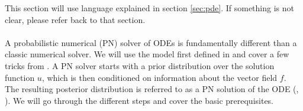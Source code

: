 \ifdefined\COMPILINGFROMMAIN
\else
    
    
\fi

This section will use language explained in section \ref{sec:pde}. If something is not clear, please refer back to that section.
\\
\\
A probabilistic numerical (PN) solver of ODEs is fundamentally different than a classic numerical solver. We will use the model first defined in \cite{invention_of_ODE_solver} and cover a few tricks from \cite{nicoThesis}. A PN solver starts with a prior distribution over the solution function $u$, which is then conditioned on information about the vector field $f$. The resulting posterior distribution is referred to as a PN solution of the ODE (\cite{nicoThesis}, \cite{exponential_probabilistic}).
We will go through the different steps and cover the basic prerequisites.

